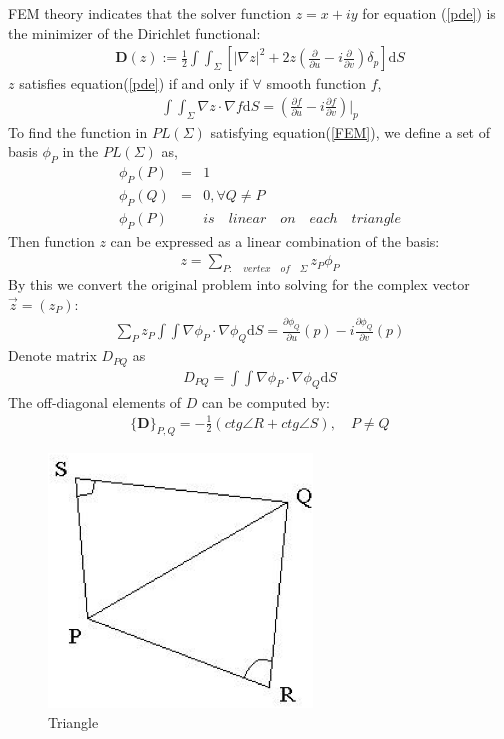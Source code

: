 \documentclass{InsightArticle}
\begin{document}
  FEM theory indicates that the solver function $z=x+iy$ for equation
  (\ref{pde}) is the minimizer of the Dirichlet functional:
  \begin{eqnarray}  
    \mathbf{D}(z):=\frac{1}{2}\int\int_{\Sigma}[ |\nabla z|^2 + 2z (\frac{\partial}{\partial u} - i\frac{\partial}{\partial v})\delta_p ]\mathrm{d}S \label{DirichletFunctional}
  \end{eqnarray}      
  $z$ satisfies equation(\ref{pde}) if and only if $\forall$ smooth
  function $f$,
  \begin{eqnarray}  
    \int\int_{\Sigma} \nabla z \cdot \nabla f \mathrm{d}S = (\frac{\partial f}{\partial u} - i\frac{\partial f}{\partial v})|_p \label{FEM}
  \end{eqnarray}    
  To find the function in $PL(\Sigma)$ satisfying equation(\ref{FEM}),
  we define a set of basis $\phi_P$ in the $PL(\Sigma)$ as,
  \begin{eqnarray}  
    \phi_P(P) &=& 1 \nonumber \\
    \phi_P(Q) &=& 0, \forall Q \ne P \nonumber \\
    \phi_P(P) && is \quad linear \quad on \quad each \quad triangle \label{basis}
  \end{eqnarray}  
  Then function $z$ can be expressed as a linear combination of the
  basis:
  \begin{eqnarray}  
    z = \sum_{P:\quad vertex \quad of \quad \Sigma} z_P \phi_P \label{zInBasis}
  \end{eqnarray}  
  By this we convert the original problem into solving for the complex
  vector $\vec{z}=(z_P)$:
  \begin{eqnarray}  
    \sum_P z_P \int\int \nabla \phi_P \cdot \nabla \phi_Q \mathrm{d}S = \frac{\partial \phi_Q}{\partial u}(p) - i \frac{\partial \phi_Q}{\partial v}(p)
    \label{allQ}
  \end{eqnarray}  
  Denote matrix $D_{PQ}$ as
  \begin{eqnarray}  
    D_{PQ} = \int\int \nabla \phi_P \cdot \nabla \phi_Q \mathrm{d}S  \label{Dpq}
  \end{eqnarray}  
  The off-diagonal elements of $D$ can be computed by:
  \begin{eqnarray}  
    \{ \mathbf{D} \}_{P,Q } = -\frac{1}{2}(ctg\angle R + ctg\angle S), \quad P \ne Q  \label{ctg}
  \end{eqnarray}  
  \begin{figure}
		\begin{center}
			\includegraphics[width=7cm]{PntPQRS.eps} \caption{Triangle} \label{PntPQRS}
    \end{center}
  \end{figure}  
\end{document}
